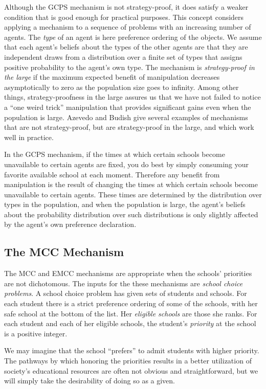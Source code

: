 \documentclass[12pt]{article}
\theoremstyle{definition}
\begin{document}
Although the GCPS mechanism is not strategy-proof, it does satisfy a
weaker condition that is good enough for practical purposes.  This
concept considers applying a mechanism to a sequence of problems with
an increasing number of agents.  The \emph{type} of an agent is here
preference ordering of the objects.  We assume that each agent's
beliefs about the types of the other agents are that they are
independent draws from a distribution over a finite set of types that
assigns positive probability to the agent's own type.  The mechanism
is \emph{strategy-proof in the large} \citep{ab19res} if the maximum
expected benefit of manipulation decreases asymptotically to zero as
the population size goes to infinity.  Among other things,
strategy-proofness in the large assures us that we have not failed to
notice a ``one weird trick'' manipulation that provides significant
gains even when the population is large.  Azevedo and Budish give
several examples of mechanisms that are not strategy-proof, but are
strategy-proof in the large, and which work well in practice.

In the GCPS mechanism, if the times at which certain schools become
unavailable to certain agents are fixed, you do best by simply
consuming your favorite available school at each moment.  Therefore any
benefit from manipulation is the result of changing the times at which
certain schools become unavailable to certain agents.  These times are
determined by the distribution over types in the population, and when
the population is large, the agent's beliefs about the probability
distribution over such distributions is only slightly affected by the
agent's own preference declaration.
 
\subsection{The MCC Mechanism}

The MCC and EMCC mechanisms are appropriate when the schools'
priorities are not dichotomous.  The inputs for the these mechanisms
are \emph{school choice problems}.  A school choice problem has given
sets of students and schools.  For each student there is a strict
preference ordering of some of the schools, with her safe school at
the bottom of the list.  Her \emph{eligible schools} are those she
ranks.  For each student and each of her eligible schools, the
student's \emph{priority} at the school is a positive integer.

We may imagine that the school ``prefers'' to admit students with
higher priority.  The pathways by which honoring the priorities
results in a better utilization of society's educational resources are
often not obvious and straightforward, but we will simply take the
desirability of doing so as a given.
\end{document}
